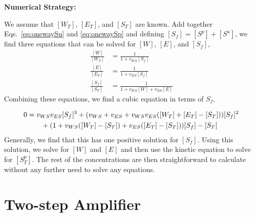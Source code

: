 \documentclass[aps,onecolumn,superscriptaddress,notitlepage]{revtex4-1}
\begin{document}
\textbf{Numerical Strategy:}

We assume that  $[W_T]$, $[E_T]$, and $[S_T]$ are known. 
Add together Eqs.~\eqref{eq:onewaySu} and \eqref{eq:onewaySp} and defining $[S_f] = [S^p]+[S^u]$, 
we find three equations that can be solved for $[W]$, $[E]$, and $[S_f]$,
\begin{align}
\frac{[W]}{[W_T]} & = \frac{1}{1 + v_{WS}[S_f]}\\
\frac{[E]}{[E_T]} & = \frac{1}{1 + v_{ES}[S_f]}\\
\frac{[S_f]}{[S_T]} &= \frac{1}{1 + v_{WS}[W]+ v_{ES}[E]}
\end{align}
Combining these equations, we find a cubic equation in terms of $S_f$,

\begin{align}
0 &= v_{WS}v_{ES}[S_f]^3 +\qty(v_{WS}+v_{ES} + v_{WS}v_{ES}([W_T]+[E_T]- [S_T])) [S_f]^2\\
&\qquad + \qty(1+v_{WS}([W_T]-[S_T]) + v_{ES}([E_T]-[S_T]))[S_f] - [S_T]
\end{align}
Generally, we find that this has one positive solution for $[S_f]$. 
Using this solution, we solve for $[W]$ and $[E]$ and then use the kinetic equation to solve for $[S_T^p]$. The rest of the concentrations are then straightforward to calculate without any further need to solve any equations.



%
%
%
%
%
%


\section{Two-step Amplifier}
\end{document}

